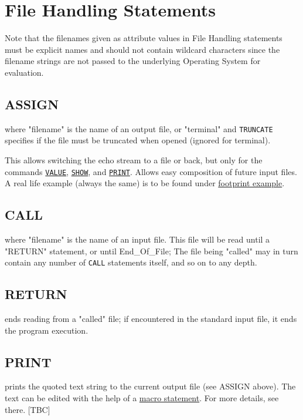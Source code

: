 \chapter{File Handling Statements}
\label{chap:files}

Note that the filenames given as attribute values in File Handling statements 
must be explicit names and should not contain wildcard characters since the 
filename strings are not passed to the underlying Operating System for evaluation.


\section{ASSIGN}
\label{sec:assign}

where "filename" is the name of an output file, or "terminal" and
{\tt TRUNCATE} specifies if the file must be truncated when opened (ignored
for terminal). 

This allows switching the echo stream to a file or back,
but only for the commands \hyperref[sec:value]{\tt VALUE}, 
\hyperref[sec:show]{\tt SHOW}, and \hyperref[sec:print]{\tt PRINT}. 
Allows easy composition of future \madx input files. A real life example 
(always the same) is to be found under \href{foot.html}{footprint example}.  

\section{CALL}
\label{sec:call}
where "filename"  is the name of an input file. This file will be read
until a "RETURN" statement, or until End\_Of\_File; The file being
"called" may in turn contain any number of {\tt CALL} statements
itself, and so on to any depth.  

\section{RETURN}
\label{Sec:return}
ends reading from a "called" file; if encountered in the standard input
file, it ends the program execution.  


\section{PRINT}
\label{sec:print}
prints the quoted text string to the current output file (see ASSIGN
above). The text can be edited with the help of a
\href{special.html#macro}{macro statement}. For more details, see
there. [TBC]  


